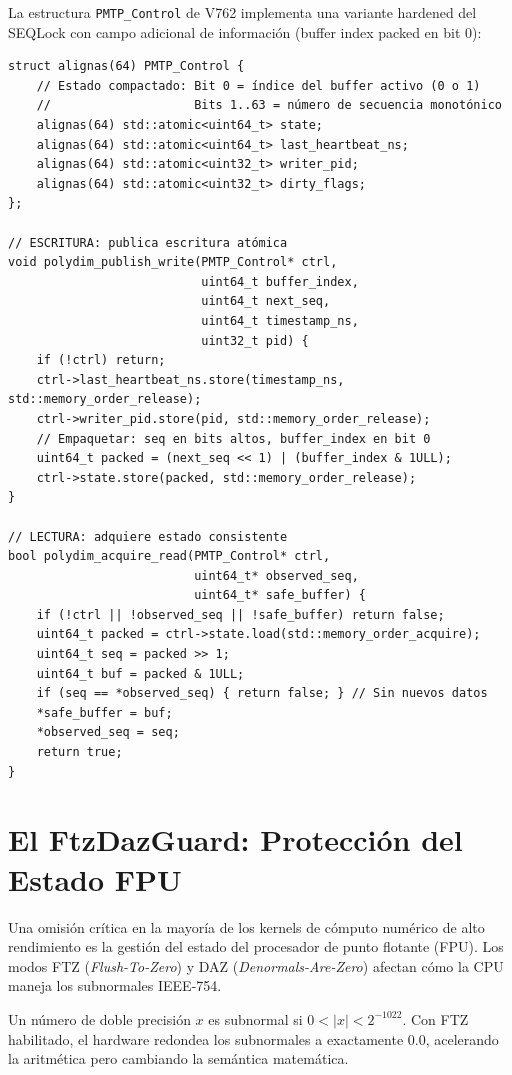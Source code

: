 La estructura \texttt{PMTP\_Control} de V762 implementa una variante hardened del SEQLock
con campo adicional de información (buffer index packed en bit 0):

\begin{verbatim}
struct alignas(64) PMTP_Control {
    // Estado compactado: Bit 0 = índice del buffer activo (0 o 1)
    //                    Bits 1..63 = número de secuencia monotónico
    alignas(64) std::atomic<uint64_t> state;
    alignas(64) std::atomic<uint64_t> last_heartbeat_ns;
    alignas(64) std::atomic<uint32_t> writer_pid;
    alignas(64) std::atomic<uint32_t> dirty_flags;
};

// ESCRITURA: publica escritura atómica
void polydim_publish_write(PMTP_Control* ctrl,
                           uint64_t buffer_index,
                           uint64_t next_seq,
                           uint64_t timestamp_ns,
                           uint32_t pid) {
    if (!ctrl) return;
    ctrl->last_heartbeat_ns.store(timestamp_ns, std::memory_order_release);
    ctrl->writer_pid.store(pid, std::memory_order_release);
    // Empaquetar: seq en bits altos, buffer_index en bit 0
    uint64_t packed = (next_seq << 1) | (buffer_index & 1ULL);
    ctrl->state.store(packed, std::memory_order_release);
}

// LECTURA: adquiere estado consistente
bool polydim_acquire_read(PMTP_Control* ctrl,
                          uint64_t* observed_seq,
                          uint64_t* safe_buffer) {
    if (!ctrl || !observed_seq || !safe_buffer) return false;
    uint64_t packed = ctrl->state.load(std::memory_order_acquire);
    uint64_t seq = packed >> 1;
    uint64_t buf = packed & 1ULL;
    if (seq == *observed_seq) { return false; } // Sin nuevos datos
    *safe_buffer = buf;
    *observed_seq = seq;
    return true;
}
\end{verbatim}

\section{El FtzDazGuard: Protección del Estado FPU}

Una omisión crítica en la mayoría de los kernels de cómputo numérico de alto rendimiento
es la gestión del estado del procesador de punto flotante (FPU). Los modos FTZ
(\textit{Flush-To-Zero}) y DAZ (\textit{Denormals-Are-Zero}) afectan cómo la CPU
maneja los subnormales IEEE-754.

\begin{definition}
Un número de doble precisión $x$ es subnormal si $0 < |x| < 2^{-1022}$.
Con FTZ habilitado, el hardware redondea los subnormales a exactamente $0.0$,
acelerando la aritmética pero cambiando la semántica matemática.
\end{definition}

